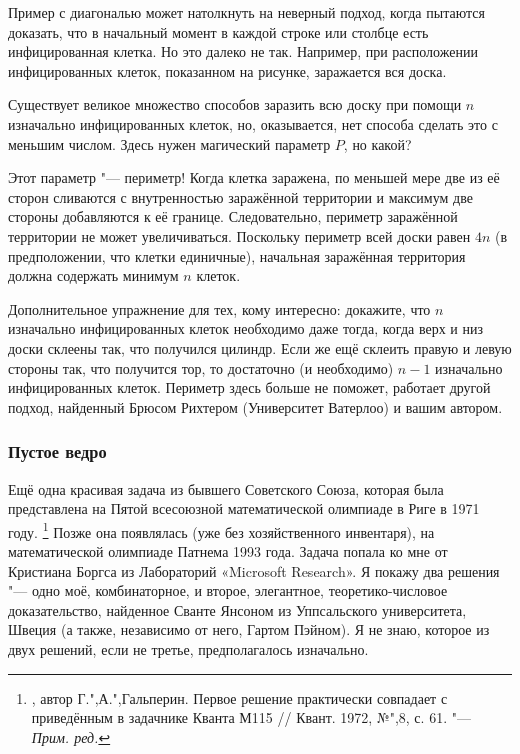 \documentclass[twoside]{book}
\begin{document}
\medskip

Пример с диагональю может натолкнуть на неверный подход, когда пытаются доказать, что в начальный момент в каждой строке или столбце есть инфицированная клетка.
Но это далеко не так.
Например, при расположении инфицированных клеток, показанном на рисунке, заражается вся доска.


Существует великое множество способов заразить всю доску при помощи $n$ изначально инфицированных клеток, но, оказывается, нет способа сделать это с меньшим числом.
Здесь нужен магический параметр $P$, но какой?

Этот параметр "--- периметр!
Когда клетка заражена, по меньшей мере две из её сторон сливаются с внутренностью заражённой территории и максимум две стороны добавляются к её границе.
Следовательно, периметр заражённой территории не может увеличиваться.
Поскольку периметр всей доски равен $4n$ (в предположении, что клетки единичные), начальная заражённая территория должна содержать минимум $n$ клеток.
\heart

Дополнительное упражнение для тех, кому интересно: докажите, что $n$ изначально инфицированных клеток необходимо даже тогда, когда верх и низ доски склеены так, что получился цилиндр.
Если же ещё склеить правую и левую стороны так, что получится тор, то достаточно (и необходимо) $n-1$ изначально инфицированных клеток.
Периметр здесь больше не поможет,
работает другой подход, найденный Брюсом Рихтером (Университет Ватерлоо) %
и вашим автором.

\subsubsection*{Пустое ведро}%

Ещё одна красивая задача из бывшего Советского Союза, которая была представлена на Пятой всесоюзной математической олимпиаде в Риге в 1971 году.%
\footnote{\cite[№148]{ВсМО}, автор Г.",А.",Гальперин.
Первое решение практически совпадает с приведённым в задачнике Кванта М115 /\!/ {Квант}. 1972, №",8, с. 61. "--- \emph{Прим. ред.}}
Позже она появлялась (уже без хозяйственного инвентаря), на математической олимпиаде Патнема 1993 года.
Задача попала ко мне от Кристиана Боргса из Лабораторий «Microsoft Research». %
Я покажу два решения "--- одно моё, комбинаторное, и второе, элегантное, теоретико-числовое доказательство, найденное Сванте Янсоном из Уппсальского университета, Швеция %
(а также, независимо от него, Гартом Пэйном). %
Я не знаю, которое из двух решений, если не третье, предполагалось изначально.
\end{document}

